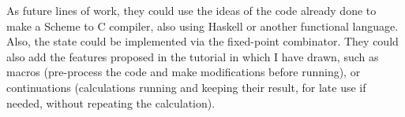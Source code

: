 As future lines of work, they could use the ideas of the code already done to make a Scheme to C compiler, also using Haskell or another functional language. Also, the state could be implemented via the fixed-point combinator. They could also add the features proposed in the tutorial in which I have drawn, such as macros (pre-process the code and make modifications before running), or continuations (calculations running and keeping their result, for late use if needed, without repeating the calculation).